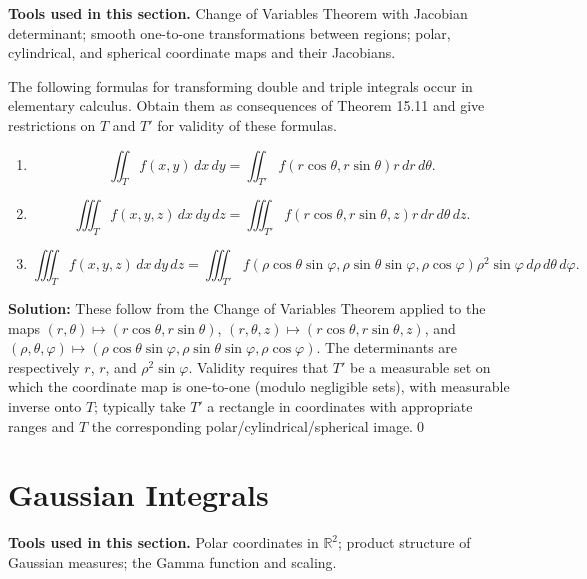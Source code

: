 \noindent\textbf{Tools used in this section.} Change of Variables Theorem with Jacobian determinant; smooth one-to-one transformations between regions; polar, cylindrical, and spherical coordinate maps and their Jacobians.



\begin{problembox}
The following formulas for transforming double and triple integrals occur in elementary calculus. Obtain them as consequences of Theorem 15.11 and give restrictions on \( T \) and \( T' \) for validity of these formulas.
\begin{enumerate}[label=(\alph*)]
\item \[ \iint_T f(x, y) \, dx \, dy = \iint_{T'} f(r \cos \theta, r \sin \theta)r \, dr \, d\theta.\]
\item \[ \iiint_T f(x, y, z) \, dx \, dy \, dz = \iiint_{T'} f(r \cos \theta, r \sin \theta, z)r \, dr \, d\theta \, dz.\]
\item \[ \iiint_T f(x, y, z) \, dx \, dy \, dz = \iiint_{T'} f(\rho \cos \theta \sin \varphi, \rho \sin \theta \sin \varphi, \rho \cos \varphi) \rho^2 \sin \varphi \, d\rho \, d\theta \, d\varphi.\]
\end{enumerate}
\end{problembox}

\noindent\textbf{Solution:}
These follow from the Change of Variables Theorem applied to the maps
\( (r,\theta)\mapsto (r\cos\theta, r\sin\theta) \),
\( (r,\theta,z)\mapsto (r\cos\theta, r\sin\theta, z) \), and
\( (\rho,\theta,\varphi)\mapsto (\rho\cos\theta\sin\varphi,\rho\sin\theta\sin\varphi,\rho\cos\varphi) \).
The determinants are respectively \(r\), \(r\), and \(\rho^2\sin\varphi\). Validity requires that \(T'\) be a measurable set on which the coordinate map is one-to-one (modulo negligible sets), with measurable inverse onto \(T\); typically take \(T'\) a rectangle in coordinates with appropriate ranges and \(T\) the corresponding polar/cylindrical/spherical image.\qed
\section{Gaussian Integrals}

\noindent\textbf{Tools used in this section.} Polar coordinates in \(\mathbb{R}^2\); product structure of Gaussian measures; the Gamma function and scaling.




